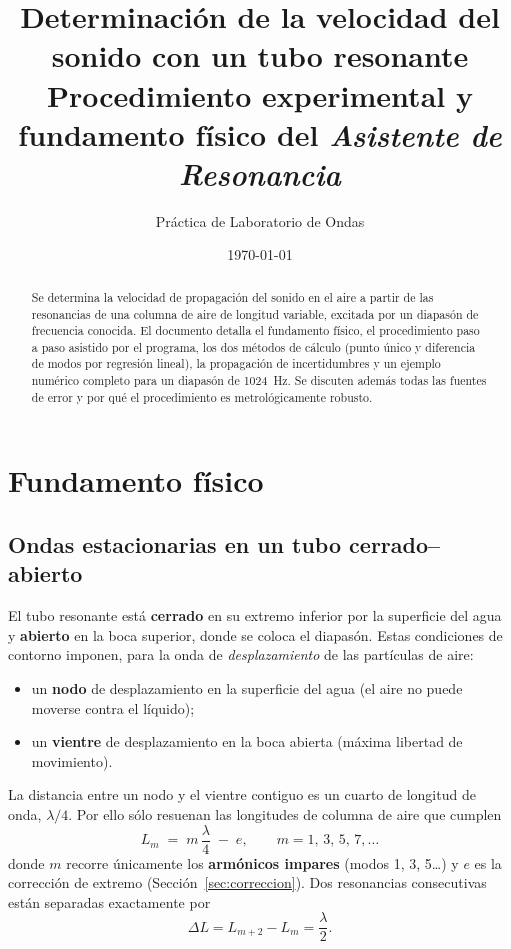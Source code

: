 \documentclass[11pt,a4paper]{article}
\title{\textbf{Determinación de la velocidad del sonido con un tubo resonante}\\[2mm]
\large Procedimiento experimental y fundamento físico del \emph{Asistente de Resonancia}}
\author{Práctica de Laboratorio de Ondas}
\date{\today}
\begin{document}
\maketitle

\begin{abstract}
\noindent Se determina la velocidad de propagación del sonido en el aire a partir de las
resonancias de una columna de aire de longitud variable, excitada por un diapasón de
frecuencia conocida. El documento detalla el fundamento físico, el procedimiento paso a paso
asistido por el programa, los dos métodos de cálculo (punto único y diferencia de modos por
regresión lineal), la propagación de incertidumbres y un ejemplo numérico completo para un
diapasón de \SI{1024}{\hertz}. Se discuten además todas las fuentes de error y por qué el
procedimiento es metrológicamente robusto.
\end{abstract}

\section{Fundamento físico}

\subsection{Ondas estacionarias en un tubo cerrado--abierto}
El tubo resonante está \textbf{cerrado} en su extremo inferior por la superficie del agua y
\textbf{abierto} en la boca superior, donde se coloca el diapasón. Estas condiciones de
contorno imponen, para la onda de \emph{desplazamiento} de las partículas de aire:
\begin{itemize}[nosep]
  \item un \textbf{nodo} de desplazamiento en la superficie del agua (el aire no puede moverse contra el líquido);
  \item un \textbf{vientre} de desplazamiento en la boca abierta (máxima libertad de movimiento).
\end{itemize}
La distancia entre un nodo y el vientre contiguo es un cuarto de longitud de onda, $\lambda/4$.
Por ello sólo resuenan las longitudes de columna de aire que cumplen
\begin{equation}
  L_m \;=\; m\,\frac{\lambda}{4} \;-\; e, \qquad m = 1,\,3,\,5,\,7,\dots
  \label{eq:resonancia}
\end{equation}
donde $m$ recorre únicamente los \textbf{armónicos impares} (modos 1, 3, 5\dots) y $e$ es la
corrección de extremo (Sección~\ref{sec:correccion}). Dos resonancias consecutivas están
separadas exactamente por
\begin{equation}
  \Delta L = L_{m+2}-L_m = \frac{\lambda}{2}.
  \label{eq:separacion}
\end{equation}
\end{document}
